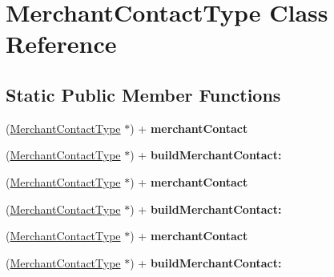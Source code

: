 \hypertarget{interface_merchant_contact_type}{
\section{MerchantContactType Class Reference}
\label{interface_merchant_contact_type}
}
\subsection*{Static Public Member Functions}
\begin{DoxyCompactItemize}
\item 
\hypertarget{interface_merchant_contact_type_acb11e1295b9e63d14e79a858242f3107}{
(\hyperlink{interface_merchant_contact_type}{MerchantContactType} $\ast$) + {\bfseries merchantContact}}
\label{interface_merchant_contact_type_acb11e1295b9e63d14e79a858242f3107}

\item 
\hypertarget{interface_merchant_contact_type_a571b06cda4e6e886064a111fb058da4b}{
(\hyperlink{interface_merchant_contact_type}{MerchantContactType} $\ast$) + {\bfseries buildMerchantContact:}}
\label{interface_merchant_contact_type_a571b06cda4e6e886064a111fb058da4b}

\item 
\hypertarget{interface_merchant_contact_type_acb11e1295b9e63d14e79a858242f3107}{
(\hyperlink{interface_merchant_contact_type}{MerchantContactType} $\ast$) + {\bfseries merchantContact}}
\label{interface_merchant_contact_type_acb11e1295b9e63d14e79a858242f3107}

\item 
\hypertarget{interface_merchant_contact_type_a571b06cda4e6e886064a111fb058da4b}{
(\hyperlink{interface_merchant_contact_type}{MerchantContactType} $\ast$) + {\bfseries buildMerchantContact:}}
\label{interface_merchant_contact_type_a571b06cda4e6e886064a111fb058da4b}

\item 
\hypertarget{interface_merchant_contact_type_acb11e1295b9e63d14e79a858242f3107}{
(\hyperlink{interface_merchant_contact_type}{MerchantContactType} $\ast$) + {\bfseries merchantContact}}
\label{interface_merchant_contact_type_acb11e1295b9e63d14e79a858242f3107}

\item 
\hypertarget{interface_merchant_contact_type_a571b06cda4e6e886064a111fb058da4b}{
(\hyperlink{interface_merchant_contact_type}{MerchantContactType} $\ast$) + {\bfseries buildMerchantContact:}}
\label{interface_merchant_contact_type_a571b06cda4e6e886064a111fb058da4b}

\end{DoxyCompactItemize}
